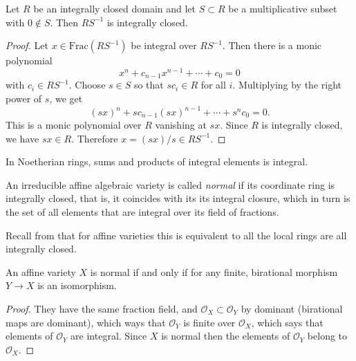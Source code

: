 \begin{proposition}
\label{prop-localization-integrally-closed}
Let $R$ be an integrally closed domain and
let $S \subset R$ be a multiplicative
subset with $0 \notin S$.
Then $RS^{-1}$ is integrally
closed.
\end{proposition}

\begin{proof}
Let $x \in \text{Frac}(RS^{-1})$ be
integral over $RS^{-1}$.
Then there is a monic polynomial
\[
x^n+c_{n-1}x^{n-1}+\cdots+c_0=0
\]
with $c_i \in RS^{-1}$.
Choose $s \in S$ so that
$sc_i \in R$ for all $i$.
Multiplying by the right power of $s$,
we get
\[
(sx)^n+s c_{n-1}(sx)^{n-1}
+\cdots+s^n c_0=0.
\]
This is a monic polynomial over $R$
vanishing at $sx$.
Since $R$ is integrally closed,
we have $sx \in R$.
Therefore $x=(sx)/s \in RS^{-1}$.
\end{proof}

\begin{lemma}
\label{lemma-sums-of-integral-elements}
In Noetherian rings,
sums and products of integral
elements is integral.
\end{lemma}

\begin{definition}
\label{definition-normal-variety}
An irreducible affine algebraic variety is
called {\it normal} if its coordinate ring is
integrally closed, that is, it coincides with
its its integral closure, which in turn is
the set of all elements that are integral
over its field of fractions.
\end{definition}

\noindent
Recall from \cite[Exercise 3.17, Chapter
1]{har}
that for affine varieties this is equivalent
to all
the local rings are all integrally closed.

\begin{proposition}
\label{proposition-normal-iff-birational}
An affine variety $X$ is normal if and only
if
for any finite, birational morphism
$Y \to X$ is an isomorphism.
\end{proposition}

\begin{proof}
They have the same fraction field, and
$\mathcal{O}_X \subset \mathcal{O}_Y$ by
dominant (birational maps are dominant),
which ways that $\mathcal{O}_Y$ is finite
over $\mathcal{O}_X$, which says that
elements of $\mathcal{O}_Y$ are integral.
Since $X$ is normal then the elements of
$\mathcal{O}_Y$ belong to $\mathcal{O}_X$.
\end{proof}


